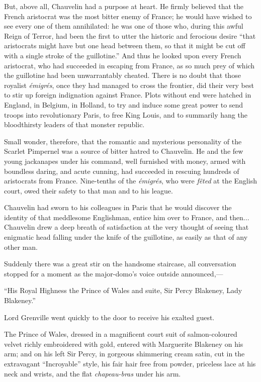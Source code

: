 \documentclass[paper=a5,BCOR=7mm,twoside,DIV=calc,12pt,usegeometry,chapterprefix,endperiod,headings=big]{scrbook}
\begin{document}
But, above all, Chauvelin had a purpose at heart. He firmly believed that the French aristocrat was the most bitter enemy of France; he would have wished to see every one of them annihilated: he was one of those who, during this awful Reign of Terror, had been the first to utter the historic and ferocious desire \enquote{that aristocrats might have but one head between them, so that it might be cut off with a single stroke of the guillotine.} And thus he looked upon every French aristocrat, who had succeeded in escaping from France, as so much prey of which the guillotine had been unwarrantably cheated. There is no doubt that those royalist \textit{émigrés}, once they had managed to cross the frontier, did their very best to stir up foreign indignation against France. Plots without end were hatched in England, in Belgium, in Holland, to try and induce some great power to send troops into revolutionary Paris, to free King Louis, and to summarily hang the bloodthirsty leaders of that monster republic.

Small wonder, therefore, that the romantic and mysterious personality of the Scarlet Pimpernel was a source of bitter hatred to Chauvelin. He and the few young jackanapes under his command, well furnished with money, armed with boundless daring, and acute cunning, had succeeded in rescuing hundreds of aristocrats from France. Nine-tenths of the \textit{émigrés}, who were \textit{fêted} at the English court, owed their safety to that man and to his league.

Chauvelin had sworn to his colleagues in Paris that he would discover the identity of that meddlesome Englishman, entice him over to France, and then... Chauvelin drew a deep breath of satisfaction at the very thought of seeing that enigmatic head falling under the knife of the guillotine, as easily as that of any other man.

Suddenly there was a great stir on the handsome staircase, all conversation stopped for a moment as the major-domo's voice outside announced,---

\enquote{His Royal Highness the Prince of Wales and suite, Sir Percy Blakeney, Lady Blakeney.}

Lord Grenville went quickly to the door to receive his exalted guest.

The Prince of Wales, dressed in a magnificent court suit of salmon-coloured velvet richly embroidered with gold, entered with Marguerite Blakeney on his arm; and on his left Sir Percy, in gorgeous shimmering cream satin, cut in the extravagant \enquote{Incroyable} style, his fair hair free from powder, priceless lace at his neck and wrists, and the flat \textit{chapeau-bras} under his arm.
\end{document}
